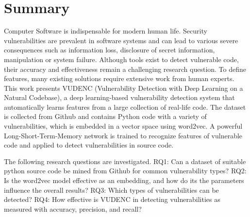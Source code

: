 \documentclass[
	a4paper,
	pagesize,
	pdftex,
	12pt,
	twoside, %
	BCOR=5mm, %
	ngerman,
	fleqn,
	final,
	]{scrartcl}
\begin{document}

\mitverteidigung %
\makeTitel
\tableofcontents
\newpage

\section{Summary}
Computer Software is indispensable for modern human life. Security vulnerabilities are prevalent in software systems and can lead to various severe consequences such as information loss, disclosure of secret information, manipulation or system failure. Although tools exist to detect vulnerable code, their accuracy and effectiveness remain a challenging research question. To define features, many existing solutions require extensive work from human experts.\\
This work presents VUDENC (Vulnerability Detection with Deep Learning on a Natural Codebase), a deep learning-based vulnerability detection system that automatically learns features from a large collection of real-life code. The dataset is collected from Github and contains Python code with a variety of vulnerabilities, which is embedded in a vector space using word2vec. A powerful Long-Short-Term-Memory network is trained to recognize features of vulnerable code and applied to detect vulnerabilities in source code. 

The following research questions are investigated. RQ1: Can a dataset of suitable python source code be mined from Github for common vulnerability types? RQ2: Is the word2vec model effective as an embedding, and how do its the parameters influence the overall results? RQ3: Which types of vulnerabilities can be detected? RQ4: How effective is VUDENC in detecting vulnerabilities as measured with accuracy, precision, and recall? 
\end{document}
